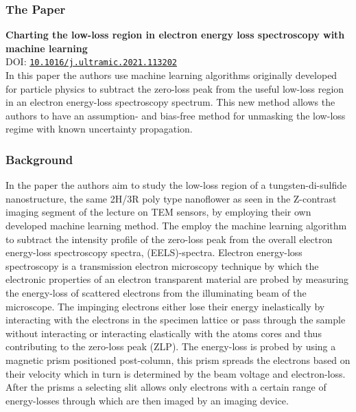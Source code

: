 \documentclass[a4paper]{scrartcl}
\begin{document}
\subsubsection*{The Paper}
\textbf{Charting the low-loss region in electron energy loss spectroscopy with
machine learning}\\
DOI: \href{https://doi.org/10.1016/j.ultramic.2021.113202}{\texttt{10.1016/j.ultramic.2021.113202}}\\
In this paper the authors use machine learning algorithms originally developed for particle physics to subtract the zero-loss peak from the useful low-loss region in an electron energy-loss spectroscopy spectrum. This new method allows the authors to have an assumption- and bias-free method for unmasking the low-loss regime with known uncertainty propagation.\\

\subsubsection*{Background}
In the paper the authors aim to study the low-loss region of a tungsten-di-sulfide nanostructure, the same 2H/3R poly type nanoflower as seen in the Z-contrast imaging segment of the lecture on TEM sensors, by employing their own developed machine learning method. The employ the machine learning algorithm to subtract the intensity profile of the zero-loss peak from the overall electron energy-loss spectroscopy spectra, (EELS)-spectra. Electron energy-loss spectroscopy is a transmission electron microscopy technique by which the electronic properties of an electron transparent material are probed by measuring the energy-loss of scattered electrons from the illuminating beam of the microscope. The impinging electrons either lose their energy inelastically by interacting with the electrons in the specimen lattice or pass through the sample without interacting or interacting elastically with the atoms cores and thus contributing to the zero-loss peak (ZLP). The energy-loss is probed by using a magnetic prism positioned post-column, this prism spreads the electrons based on their velocity which in turn is determined by the beam voltage and electron-loss. After the prisms a selecting slit allows only electrons with a certain range of energy-losses through which are then imaged by an imaging device.\\
\end{document}
